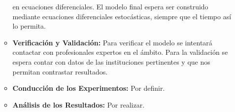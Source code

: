 \documentclass[12pt]{article}
\begin{document}
\begin{enumerate}
\begin{itemize}
            en ecuaciones diferenciales. El modelo final espera ser construido mediante ecuaciones diferenciales
            estocásticas, siempre que el tiempo así lo permita.
          \item \textbf{Verificación y Validación:} Para verificar el modelo se intentará contactar con profesionales
            expertos en el ámbito. Para la validación se espera contar con datos de las instituciones pertinentes
            y que nos permitan contrastar resultados.
          \item \textbf{Conducción de los Experimentos:} Por definir.
          \item \textbf{Análisis de los Resultados:} Por realizar.
        \end{itemize}

    \end{enumerate}
        
            
            
        
            
            
\end{document}
